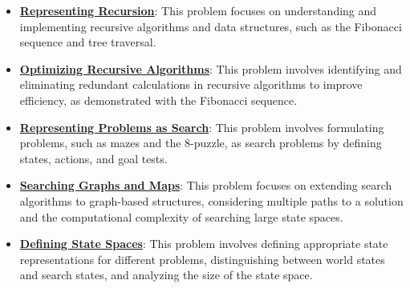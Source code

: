 \documentclass{article}%
\begin{document}
\begin{itemize}[leftmargin=*]%
\item \href{https://purdue.brightspace.com/d2l/common/assets/pdfjs-d2l-dist/1.0.14-legacy/web/viewer.html?file=\%2Fcontent\%2Fenforced\%2F1095467-wl.202510.CS.24300.001\%2F14L1-DepthFS.pdf\%3Fou\%3D1095467\&lang=en-us\&container=d2l-fileviewer-rendered-pdf\&fullscreen=d2l-fileviewer-rendered-pdf-dialog\&height=667#page=3}{\textbf{Representing Recursion}}: This problem focuses on understanding and implementing recursive algorithms and data structures, such as the Fibonacci sequence and tree traversal.%
\item \href{https://purdue.brightspace.com/d2l/common/assets/pdfjs-d2l-dist/1.0.14-legacy/web/viewer.html?file=\%2Fcontent\%2Fenforced\%2F1095467-wl.202510.CS.24300.001\%2F14L1-DepthFS.pdf\%3Fou\%3D1095467\&lang=en-us\&container=d2l-fileviewer-rendered-pdf\&fullscreen=d2l-fileviewer-rendered-pdf-dialog\&height=667#page=21}{\textbf{Optimizing Recursive Algorithms}}: This problem involves identifying and eliminating redundant calculations in recursive algorithms to improve efficiency, as demonstrated with the Fibonacci sequence.%
\item \href{https://purdue.brightspace.com/d2l/common/assets/pdfjs-d2l-dist/1.0.14-legacy/web/viewer.html?file=\%2Fcontent\%2Fenforced\%2F1095467-wl.202510.CS.24300.001\%2F14L1-DepthFS.pdf\%3Fou\%3D1095467\&lang=en-us\&container=d2l-fileviewer-rendered-pdf\&fullscreen=d2l-fileviewer-rendered-pdf-dialog\&height=667#page=14}{\textbf{Representing Problems as Search}}: This problem involves formulating problems, such as mazes and the 8-puzzle, as search problems by defining states, actions, and goal tests.%
\item \href{https://purdue.brightspace.com/d2l/common/assets/pdfjs-d2l-dist/1.0.14-legacy/web/viewer.html?file=\%2Fcontent\%2Fenforced\%2F1095467-wl.202510.CS.24300.001\%2F14L1-DepthFS.pdf\%3Fou\%3D1095467\&lang=en-us\&container=d2l-fileviewer-rendered-pdf\&fullscreen=d2l-fileviewer-rendered-pdf-dialog\&height=667#page=25}{\textbf{Searching Graphs and Maps}}: This problem focuses on extending search algorithms to graph-based structures, considering multiple paths to a solution and the computational complexity of searching large state spaces.%
\item \href{https://purdue.brightspace.com/d2l/common/assets/pdfjs-d2l-dist/1.0.14-legacy/web/viewer.html?file=\%2Fcontent\%2Fenforced\%2F1095467-wl.202510.CS.24300.001\%2F14L1-DepthFS.pdf\%3Fou\%3D1095467\&lang=en-us\&container=d2l-fileviewer-rendered-pdf\&fullscreen=d2l-fileviewer-rendered-pdf-dialog\&height=667#page=37}{\textbf{Defining State Spaces}}: This problem involves defining appropriate state representations for different problems, distinguishing between world states and search states, and analyzing the size of the state space.%

\end{itemize}
\end{document}
